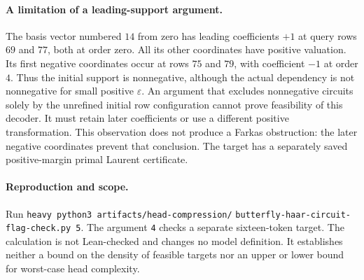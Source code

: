\documentclass{article}
\begin{document}
\paragraph{A limitation of a leading-support argument.}
The basis vector numbered $14$ from zero has leading coefficients $+1$ at
query rows $69$ and $77$, both at order zero.  All its other coordinates
have positive valuation.  Its first negative coordinates occur at rows
$75$ and $79$, with coefficient $-1$ at order $4$.
Thus the initial support is nonnegative, although the actual dependency is
not nonnegative for small positive $\varepsilon$.
An argument that excludes nonnegative circuits solely by the unrefined
initial row configuration cannot prove feasibility of this decoder.
It must retain later coefficients or use a different positive
transformation.  This observation does not produce a Farkas obstruction:
the later negative coordinates prevent that conclusion.  The target has a
separately saved positive-margin primal Laurent certificate.

\paragraph{Reproduction and scope.}
Run \texttt{heavy python3 artifacts/head-compression/}
\texttt{butterfly-haar-circuit-flag-check.py 5}.
The argument \texttt{4} checks a separate sixteen-token target.
The calculation is not Lean-checked and changes no model definition.
It establishes neither a bound on the density of feasible targets nor an
upper or lower bound for worst-case head complexity.
\end{document}
